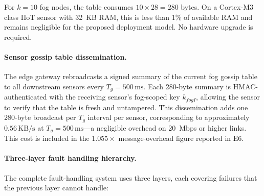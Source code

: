 \documentclass[conference]{IEEEtran}
\begin{document}
    \begin{table}[htbp]
    \caption{Sensor-Side Gossip Status Entry}
    \label{table:sensor-gossip-entry}
    \centering
    \end{table}

    For $k=10$ fog nodes, the table consumes $10\times 28=280$ bytes. On a Cortex-M3 class IIoT sensor with 32~KB RAM, this is less than 1\% of available RAM and remains negligible for the proposed deployment model. No hardware upgrade is required.

    \paragraph{Sensor gossip table dissemination.}
    The edge gateway rebroadcasts a signed summary of the current fog gossip table to all downstream sensors every $T_g = 500\,\text{ms}$. Each 280-byte summary is HMAC-authenticated with the receiving sensor's fog-scoped key $k_{fogI}$, allowing the sensor to verify that the table is fresh and untampered. This dissemination adds one 280-byte broadcast per $T_g$ interval per sensor, corresponding to approximately $0.56\,\text{KB/s}$ at $T_g=500\,\text{ms}$---a negligible overhead on 20~Mbps or higher links. This cost is included in the $1.055\times$ message-overhead figure reported in E6.

    \paragraph{Three-layer fault handling hierarchy.}
    The complete fault-handling system uses three layers, each covering failures that the previous layer cannot handle:
\end{document}
